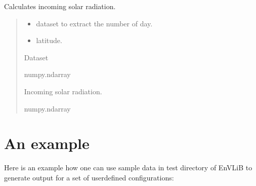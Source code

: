 \documentclass[a4paper,11pt,english]{sphinxmanual}
\begin{document}
\begin{fulllineitems}
\label{\detokenize{modules:envlib.accf.get_Fin}}
\pysigstartsignatures
{}
\pysigstopsignatures
\sphinxAtStartPar
Calculates incoming solar radiation.
\begin{quote}\begin{description}
\begin{itemize}
\item {} 
\sphinxAtStartPar
{} \textendash{} dataset to extract the number of day.

\item {} 
\sphinxAtStartPar
{} \textendash{} latitude.

\end{itemize}

\sphinxAtStartPar
Dataset

\sphinxAtStartPar
numpy.ndarray

\sphinxAtStartPar
Incoming solar radiation.

\sphinxAtStartPar
numpy.ndarray

\end{description}\end{quote}

\end{fulllineitems}



\chapter{An example}
\label{\detokenize{index:an-example}}
\sphinxAtStartPar
Here is an example how one can use sample data in test directory of EnVLiB to generate output for a set of user\sphinxhyphen{}defined configurations:
\end{document}
